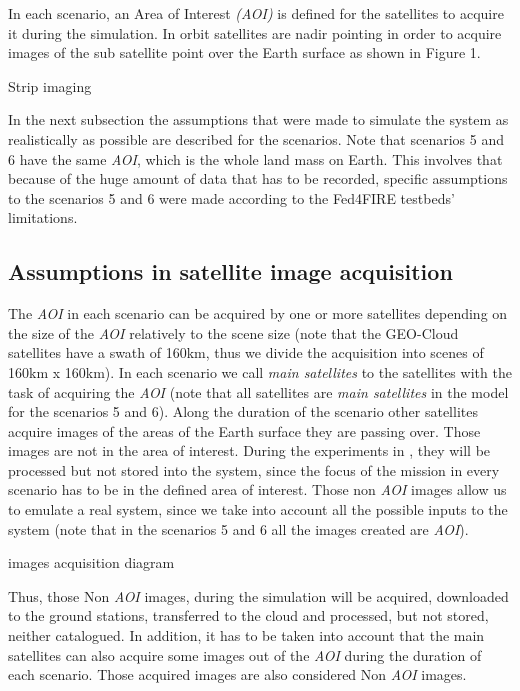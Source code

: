 In each scenario, an Area of Interest \emph{(AOI)} is defined for the satellites to acquire it during the simulation. In orbit satellites are nadir pointing in order to acquire images of the sub satellite point over the Earth surface as shown in Figure 1.

Strip imaging

In the next subsection the assumptions that were made to simulate the system as realistically as possible are described for the scenarios. Note that scenarios 5 and 6 have the same \emph{AOI}, which is the whole land mass on Earth. This involves that because of the huge amount of data that has to be recorded, specific assumptions to the scenarios 5 and 6 were made according to the Fed4FIRE testbeds’ limitations.

\subsection{Assumptions in satellite image acquisition}

The \emph{AOI} in each scenario can be acquired by one or more satellites depending on
the size of the \emph{AOI} relatively to the scene size (note that the GEO-Cloud
satellites have a swath of 160km, thus we divide the acquisition into scenes of
160km x 160km). 
In each scenario we call \emph{main satellites} to the satellites with the task
of acquiring the \emph{AOI} (note that all satellites are \emph{main satellites} in the
model for the scenarios 5 and 6). 
Along the duration of the scenario other satellites acquire images of the areas of the Earth surface they are passing over. Those images are not in the area of interest. During the experiments in \bonfire, they will be processed but not stored into the system, since the focus of the mission in every scenario has to be in the defined area of interest. Those non \emph{AOI} images allow us to emulate a real system, since we take into account all the possible inputs to the system (note that in the scenarios 5 and 6 all the images created are \emph{AOI}).

images acquisition diagram

Thus, those Non \emph{AOI} images, during the simulation will be acquired,
downloaded to the ground stations, transferred to the cloud and processed, but
not stored, neither catalogued. In addition, it has to be taken into account
that the main satellites can also acquire some images out of the \emph{AOI}
during the duration of each scenario. Those acquired images are also considered
Non \emph{AOI} images. 

